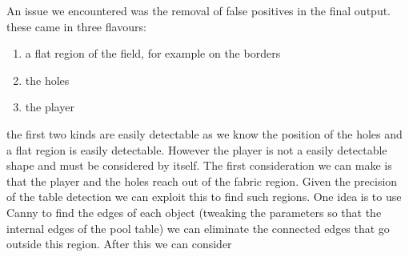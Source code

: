 An issue we encountered was the removal of false positives in the
final output. these came in three flavours:
\begin{enumerate}
    \item a flat region of the field, for example on the borders
    \item the holes 
    \item the player
\end{enumerate}

the first two kinds are easily detectable as we know the position of the holes 
and a flat region is easily detectable. However the player is not a easily detectable
shape and must be considered by itself.
The first consideration we can make is that the player and the holes reach out of the
fabric region. Given the precision of the table detection we can exploit this to find
such regions. One idea is to use Canny to find the edges of each object (tweaking 
the parameters so that the internal edges of the pool table) we can eliminate 
the connected edges that go outside this region. After this we can consider 

